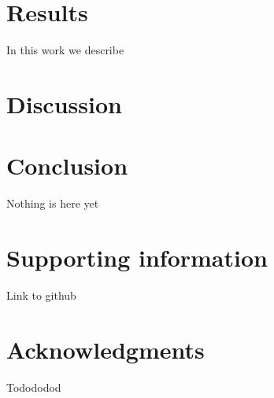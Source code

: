 \documentclass[10pt,letterpaper]{article}
\begin{document}
\section*{Results}
In this work we describe 


\section*{Discussion}











\section*{Conclusion}
Nothing is here yet

\section*{Supporting information}
Link to github

\section*{Acknowledgments}
Todododod
\end{document}
